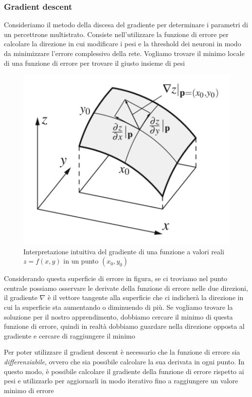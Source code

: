 \subsubsection{Gradient descent}
Consideriamo il metodo della discesa del gradiente per determinare i parametri di un percettrone multistrato. Consiste nell'utilizzare la funzione di errore per calcolare la direzione in cui modificare i pesi e la threshold dei neuroni in modo da minimizzare l'errore complessivo della rete. Vogliamo trovare il minimo locale di una funzione di errore per trovare il giusto insieme di pesi

\begin{figure}[h]
    \centering
    \includegraphics[scale=0.4]{images/gradient_descent.png}
    \caption{Interpretazione intuitiva del gradiente di una funzione a valori reali $z = f(x, y)$ in un punto $(x_0, y_0)$}
\end{figure}

Considerando questa superficie di errore in figura, se ci troviamo nel punto centrale possiamo osservare le derivate della funzione di errore nelle due direzioni, il gradiente $\nabla$ è il vettore tangente alla superficie che ci indicherà la direzione in cui la superficie sta aumentando o diminuendo di più. Se vogliamo trovare la soluzione per il nostro apprendimento, dobbiamo cercare il minimo di questa funzione di errore, quindi in realtà dobbiamo guardare nella direzione opposta al gradiente e cercare di raggiungere il minimo

Per poter utilizzare il gradient descent è necessario che la funzione di errore sia \textit{differenziabile}, ovvero che sia possibile calcolare la sua derivata in ogni punto. In questo modo, è possibile calcolare il gradiente della funzione di errore rispetto ai pesi e utilizzarlo per aggiornarli in modo iterativo fino a raggiungere un valore minimo di errore

